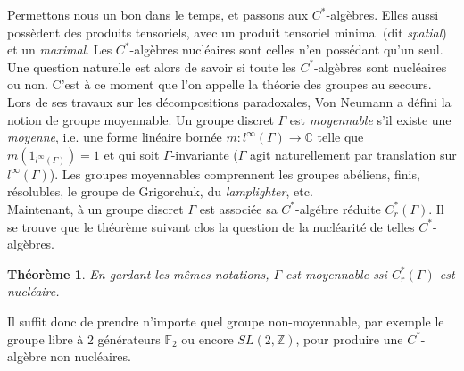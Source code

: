 \documentclass[a4paper,11pt]{article}
\newtheorem{theorem}{Th\'eor\`eme}
\begin{document}
Permettons nous un bon dans le temps, et passons aux $C^*$-alg\`ebres. Elles aussi poss\`edent des produits tensoriels, avec un produit tensoriel minimal (dit \textit{spatial}) et un \textit{maximal}. Les $C^*$-alg\`ebres nucl\'eaires sont celles n'en poss\'edant qu'un seul. Une question naturelle est alors de savoir si toute les $C^*$-alg\`ebres sont nucl\'eaires ou non. C'est \`a ce moment que l'on appelle la th\'eorie des groupes au secours. Lors de ses travaux sur les d\'ecompositions paradoxales, Von Neumann a d\'efini la notion de groupe moyennable. Un groupe discret $\Gamma$ est \textit{moyennable} s'il existe une \textit{moyenne}, i.e. une forme lin\'eaire born\'ee $m : l^\infty (\Gamma) \rightarrow \mathbb C$ telle que $m(1_{l^\infty(\Gamma)}) = 1$ et qui soit $\Gamma$-invariante ($\Gamma$ agit naturellement par translation sur $l^\infty (\Gamma)$). Les groupes moyennables comprennent les groupes ab\'eliens, finis, r\'esolubles, le groupe de Grigorchuk, du \textit{lamplighter}, etc.\\

Maintenant, \`a un groupe discret $\Gamma$ est associ\'ee sa $C^*$-alg\'ebre r\'eduite $C^*_r(\Gamma)$. Il se trouve que le th\'eor\`eme suivant clos la question de la nucl\'earit\'e de telles $C^*$-alg\`ebres. 

\begin{theorem}En gardant les m\^emes notations, $\Gamma$ est moyennable ssi $C^*_r(\Gamma)$ est nucl\'eaire.
\end{theorem}

Il suffit donc de prendre n'importe quel groupe non-moyennable, par exemple le groupe libre \`a 2 g\'en\'erateurs $\mathbb F_2$ ou encore $SL(2,\mathbb Z)$, pour produire une $C^*$-alg\`ebre non nucl\'eaires.\\    
\end{document}
